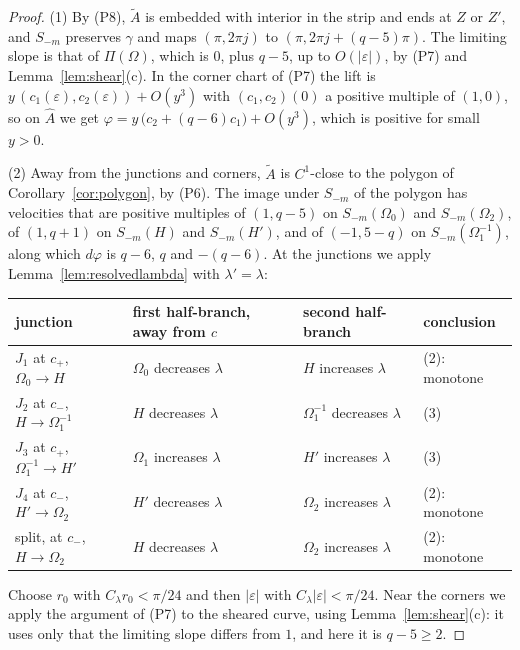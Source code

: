 \begin{proof}
(1) By (P8), $\tilde A$ is embedded with interior in the strip and ends at $Z$ or $Z'$, and $S_{-m}$
preserves $\gamma$ and maps $(\pi,2\pi j)$ to $(\pi,2\pi j+(q-5)\pi)$. The limiting slope is that of $\Pi(\Omega)$, which is $0$, plus
$q-5$, up to $O(|\varepsilon|)$, by (P7) and Lemma~\ref{lem:shear}(c). In the corner chart
of (P7) the lift is $y\,(c_1(\varepsilon),c_2(\varepsilon))+O(y^3)$ with $(c_1,c_2)(0)$ a positive multiple of $(1,0)$, so
on $\hat A$ we get $\varphi=y\,\bigl(c_2+(q-6)c_1\bigr)+O(y^3)$, which is positive for small $y>0$.

(2) Away from the junctions and corners, $\tilde A$ is $C^1$-close to the polygon of Corollary~\ref{cor:polygon},
by (P6). The image under $S_{-m}$ of the polygon has velocities that are positive multiples of
$(1,q-5)$ on $S_{-m}(\Omega_0)$ and $S_{-m}(\Omega_2)$, of $(1,q+1)$ on $S_{-m}(H)$ and $S_{-m}(H')$, and of $(-1,5-q)$ on $S_{-m}(\Omega_1^{-1})$, along which
$d\varphi$ is $q-6$, $q$ and $-(q-6)$. At the junctions we apply Lemma~\ref{lem:resolvedlambda} with $\lambda'=\lambda$:
\begin{center}\small
\begin{tabular}{llll}
\toprule
junction & first half-branch, away from $c$ & second half-branch & conclusion\\
\midrule
$J_1$ at $c_+$, $\Omega_0\to H$ & $\Omega_0$ decreases $\lambda$ & $H$ increases $\lambda$ & (2): monotone\\
$J_2$ at $c_-$, $H\to \Omega_1^{-1}$ & $H$ decreases $\lambda$ & $\Omega_1^{-1}$ decreases $\lambda$ & (3)\\
$J_3$ at $c_+$, $\Omega_1^{-1}\to H'$ & $\Omega_1$ increases $\lambda$ & $H'$ increases $\lambda$ & (3)\\
$J_4$ at $c_-$, $H'\to \Omega_2$ & $H'$ decreases $\lambda$ & $\Omega_2$ increases $\lambda$ & (2): monotone\\
split, at $c_-$, $H\to \Omega_2$ & $H$ decreases $\lambda$ & $\Omega_2$ increases $\lambda$ & (2): monotone\\
\bottomrule
\end{tabular}
\end{center}
Choose $r_0$ with $C_\lambda r_0<\pi/24$ and then $|\varepsilon|$ with $C_\lambda|\varepsilon|<\pi/24$. Near the corners we apply the argument of (P7) to the sheared curve, using Lemma~\ref{lem:shear}(c): it uses only that
the limiting slope differs from $1$, and here it is $q-5\ge2$.


\end{proof}
